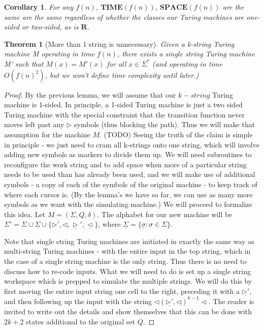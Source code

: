 \documentclass{article}
\theoremstyle{definition}
\theoremstyle{plain}
\theoremstyle{theorem}
\newtheorem{theorem}{Theorem}[section]
\newtheorem{corollary}{Corollary}[section]
\begin{document}
\begin{corollary}
	For any $f(n)$, $\bm{TIME}(f(n))$, $\bm{SPACE}(f(n))$ are the same are the same regardless of whether the classes our Turing machines are one-sided or two-sided, as is $\bm{R}$. 
\end{corollary}
\begin{theorem}[More than $1$ string is unnecessary]
Given a k-string Turing machine M operating in time $f(n)$, there exists a single string Turing machine M' such that $M(x)=M'(x)$ for all $x\in \Sigma^*$ (and operating in time $O(f(n)^2)$, but we won't define time complexity until later.)
\end{theorem}
\begin{proof}
	By the previous lemma, we will assume that our $k-string$ Turing machine is 1-sided. In principle, a 1-sided Turing machine is just a two sided Turing machine with the special constraint that the transition function never moves left past any $\triangleright$ symbols (thus blocking the path). Thus we will make that assumption for the machine $M$. (TODO) Seeing the truth of the claim is simple in principle - we just need to cram all k-strings onto one string, which will involve adding new symbols as markers to divide them up. We will need subroutines to reconfigure the work string and to add space when more of a particular string needs to be used than has already been used, and we will make use of additional symbols - a copy of each of the symbols of the original machine - to keep track of where each cursor is. (By the lemma's we have so far, we can use as many more symbols as we want with the simulating machine.) We will proceed to formalize this idea. Let $M = (\Sigma,Q,\delta)$. The alphabet for our new machine will be $\Sigma' = \Sigma \cup \underline{\Sigma} \cup \{\triangleright',\triangleleft, \underline{\triangleright}',\underline{\triangleleft}\}$, where $\underline{\Sigma} = \{ \underline{\sigma}: \sigma \in \Sigma \}$. \par
	Note that single string Turing machines are initiated in exactly the same way as multi-string Turing machines - with the entire input in the top string, which in the case of a single string machine is the only string. Thus there is no need to discuss how to re-code inputs. What we will need to do is set up a single string workspace which is prepped to simulate the multiple strings. We will do this by first moving the entire input string one cell to the right, preceding it with a $\underline{\triangleright'}$, and then following up the input with the string $\triangleleft(\underline{\triangleright'},\triangleleft)^{k-1}\triangleleft$. The reader is invited to write out the details and show themselves that this can be done with $2k+2$ states additional to the original set $Q$. \par 

\end{proof}
\end{document}
